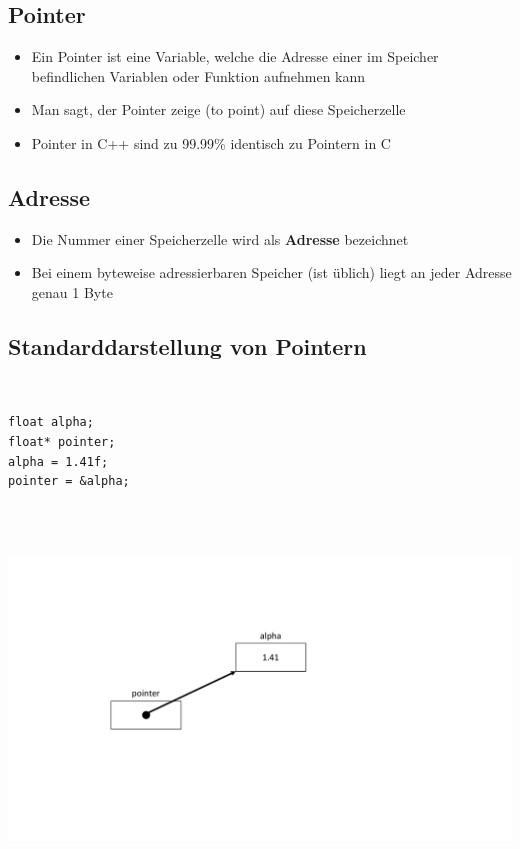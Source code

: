 \begin{multicols}{2}
	\section{Pointer}
	\begin{itemize}
		\item Ein Pointer ist eine Variable, welche die Adresse einer im Speicher befindlichen Variablen oder Funktion aufnehmen kann
		\item Man sagt, der Pointer zeige (to point) auf diese Speicherzelle
		\item Pointer in C++ sind zu 99.99\% identisch zu Pointern in C
	\end{itemize}
	
	\subsection{Adresse}
	\begin{itemize}
		\item Die Nummer einer Speicherzelle wird als \textbf{Adresse} bezeichnet
		\item Bei einem byteweise adressierbaren Speicher (ist üblich) liegt an jeder Adresse genau 1 Byte
	\end{itemize}
	\columnbreak
	\subsection{Standarddarstellung von Pointern}
	$\quad$
	\begin{minipage}{0.5\linewidth}
\begin{lstlisting}
float alpha;
float* pointer;
alpha = 1.41f;
pointer = &alpha;
\end{lstlisting}
	\end{minipage}\\
	\vspace{\baselineskip}
	$\quad$
	\begin{minipage}{0.5\linewidth}
		\includegraphics[width=\linewidth]{images/pointer1.pdf}
	\end{minipage}
\end{multicols}

